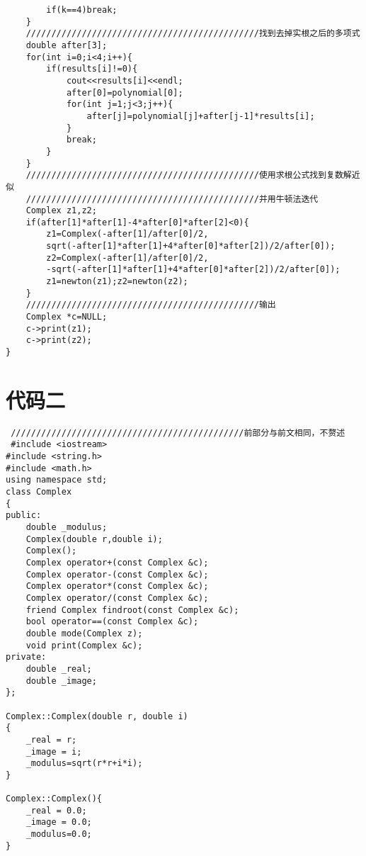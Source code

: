 \documentclass[a4paper,11pt,onecolumn,twoside]{article}
\begin{document}
\begin{appendices}
\begin{lstlisting}
        if(k==4)break;
    }
    //////////////////////////////////////////////找到去掉实根之后的多项式
    double after[3];
    for(int i=0;i<4;i++){
        if(results[i]!=0){
            cout<<results[i]<<endl;
            after[0]=polynomial[0];
            for(int j=1;j<3;j++){
                after[j]=polynomial[j]+after[j-1]*results[i];
            }
            break;
        }
    }
    //////////////////////////////////////////////使用求根公式找到复数解近似
    //////////////////////////////////////////////并用牛顿法迭代
    Complex z1,z2;
    if(after[1]*after[1]-4*after[0]*after[2]<0){
        z1=Complex(-after[1]/after[0]/2,
        sqrt(-after[1]*after[1]+4*after[0]*after[2])/2/after[0]);
        z2=Complex(-after[1]/after[0]/2,
        -sqrt(-after[1]*after[1]+4*after[0]*after[2])/2/after[0]);
        z1=newton(z1);z2=newton(z2);
    }
    //////////////////////////////////////////////输出
    Complex *c=NULL;
    c->print(z1);
    c->print(z2);
}

      \end{lstlisting}
 \section{代码二}
 \begin{lstlisting}
 //////////////////////////////////////////////前部分与前文相同，不赘述
 #include <iostream>
#include <string.h>
#include <math.h>
using namespace std;
class Complex
{
public:
    double _modulus;
    Complex(double r,double i);
    Complex();
    Complex operator+(const Complex &c);
    Complex operator-(const Complex &c);
    Complex operator*(const Complex &c);
    Complex operator/(const Complex &c);
    friend Complex findroot(const Complex &c);
    bool operator==(const Complex &c);
    double mode(Complex z);
    void print(Complex &c);
private:
    double _real;
    double _image;
};

Complex::Complex(double r, double i)
{
    _real = r;
    _image = i;
    _modulus=sqrt(r*r+i*i);
}

Complex::Complex(){
    _real = 0.0;
    _image = 0.0;
    _modulus=0.0;
}


\end{lstlisting}
\end{appendices}
\end{document}
